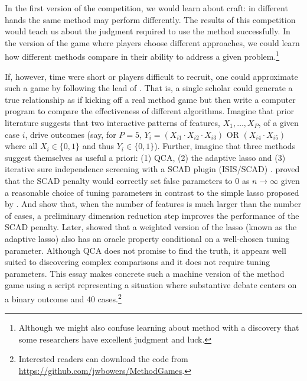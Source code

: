 \documentclass[12pt]{article}
\begin{document}
In the first version of the
competition, we would learn about craft: in different hands the same method
may perform differently. The results of this competition would teach us about
the judgment required to use the method successfully.  In the version of the
game where players choose different approaches, we could learn how different
methods compare in their ability to address a given problem.\footnote{Although
  we might also confuse learning about method with a discovery that some
  researchers have excellent judgment and luck.}

If, however, time were short or players difficult to recruit, one could
approximate such a game by following the lead of \citet{lucasfk2014}. That is,
a single scholar could generate a true relationship as if kicking off a real
method game but then write a computer program to compare the effectiveness of
different algorithms. Imagine that prior literature suggests that two
interactive patterns of features, $X_1, \ldots, X_P$, of a given case $i$,
drive outcomes (say, for $P=5$, $Y_i= (X_{i1} \cdot X_{i2} \cdot X_{i3} )
\text{ OR } ( X_{i4} \cdot X_{i5} )$ where all $X_i  \in \{0,1\}$ and thus
$Y_i \in \{0,1\}$).  Further, imagine that three methods suggest themselves as
useful a priori: (1) QCA, (2) the adaptive lasso and (3) iterative sure
independence screening with a SCAD plugin (ISIS/SCAD) \citep{fan2008sure}.
\citet{fan2001variable} proved that the SCAD penalty would correctly set false
parameters to 0 as $n \rightarrow \infty$ given a reasonable choice of tuning
parameters in contrast to the simple lasso proposed by
\cite{tibshirani1996regression}.  And \citet{fan2008sure} show that, when the
number of features is much larger than the number of cases, a preliminary
dimension reduction step improves the performance of the SCAD penalty.  Later,
\citet{zou2006adaptive} showed that a weighted version of the lasso (known as
the adaptive lasso) also has an oracle property conditional on a well-chosen
tuning parameter. Although QCA does not promise to find the truth, it appears
well suited to discovering complex comparisons and it does not require tuning
parameters.  This essay makes concrete such a machine version of the method
game using a script representing a situation where substantive debate centers
on a binary outcome and 40 cases.\footnote{Interested readers can download the
  code from \url{https://github.com/jwbowers/MethodGames}.}
\end{document}
